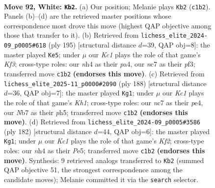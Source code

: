 \documentclass[11pt]{article}
\begin{document}
\clearpage

\begin{figure}[p]\centering
\begin{subfigure}{0.46\textwidth}\centering
\resizebox{\linewidth}{!}{%
\newchessgame
\chessboard[
  setfen={5k2/1Nn5/8/p7/P2pP2n/1P1B4/4P2p/2K1b3 w - - 0 92},
  showmover=false,
  pgfstyle=straightmove, color=movearrow, markmove={c1-b2}
]}
\caption{}
\end{subfigure}\hfill
\begin{subfigure}{0.46\textwidth}\centering
\resizebox{\linewidth}{!}{%
\newchessgame
\chessboard[
  setfen={8/8/2K2k1p/p1p3p1/Pb4P1/1B2PP2/8/8 b - - 43 98},
  showmover=false,
  pgfstyle=straightmove, color=movearrow, markmove={f6-e5}
]}
\caption{}
\end{subfigure}
\\[4pt]
\begin{subfigure}{0.46\textwidth}\centering
\resizebox{\linewidth}{!}{%
\newchessgame
\chessboard[
  setfen={8/8/1B6/P6p/1k2p1p1/4P1P1/4bP2/7K w - - 68 95},
  showmover=false,
  pgfstyle=straightmove, color=movearrow, markmove={h1-g1}
]}
\caption{}
\end{subfigure}\hfill
\begin{subfigure}{0.46\textwidth}\centering
\resizebox{\linewidth}{!}{%
\newchessgame
\chessboard[
  setfen={8/5k2/p3p3/Pb2P1Bp/1P5P/8/5K2/8 w - - 64 92},
  showmover=false,
  pgfstyle=straightmove, color=movearrow, markmove={f2-g1}
]}
\caption{}
\end{subfigure}
\caption{\textbf{Move 92, White: \texttt{Kb2}.} (a) Our position; Melanie plays \texttt{Kb2} (\texttt{c1b2}). Panels (b)--(d) are the retrieved master positions whose correspondence most drove this move (highest QAP objective among those that transfer to it). (b) Retrieved from \texttt{lichess\_elite\_2024-09\_p0005\#618} (ply 195) [structural distance $d$=39, QAP obj=8]: the master played \texttt{Ke5}; under $\mu$ our \emph{Kc1} plays the role of that game's \emph{Kf3}; cross-type roles: our \emph{n}h4 as their \emph{p}a4, our \emph{n}c7 as their \emph{p}f3; transferred move \texttt{c1b2} \textbf{(endorses this move)}. (c) Retrieved from \texttt{lichess\_elite\_2025-11\_p0000\#2090} (ply 188) [structural distance $d$=36, QAP obj=7]: the master played \texttt{Kg1}; under $\mu$ our \emph{Kc1} plays the role of that game's \emph{Kh1}; cross-type roles: our \emph{n}c7 as their \emph{p}e4, our \emph{N}b7 as their \emph{p}h5; transferred move \texttt{c1b2} \textbf{(endorses this move)}. (d) Retrieved from \texttt{lichess\_elite\_2024-09\_p0005\#3586} (ply 182) [structural distance $d$=44, QAP obj=6]: the master played \texttt{Kg1}; under $\mu$ our \emph{Kc1} plays the role of that game's \emph{Kf2}; cross-type roles: our \emph{n}h4 as their \emph{P}e5; transferred move \texttt{c1b2} \textbf{(endorses this move)}. Synthesis: 9 retrieved analogs transferred to \texttt{Kb2} (summed QAP objective 51, the strongest correspondence among the candidate moves); Melanie committed it via the \texttt{search} selector.}
\label{fig:thought-m182}
\end{figure}
\end{document}
